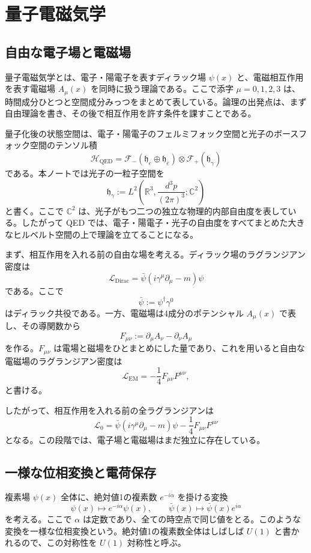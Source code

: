 \section{量子電磁気学}

\subsection{自由な電子場と電磁場}
量子電磁気学とは、電子・陽電子を表すディラック場 $\psi(x)$ と、電磁相互作用を表す電磁場 $A_\mu(x)$ を同時に扱う理論である。ここで添字 $\mu=0,1,2,3$ は、時間成分ひとつと空間成分みっつをまとめて表している。論理の出発点は、まず自由理論を書き、その後で相互作用を許す条件を課すことである。

量子化後の状態空間は、電子・陽電子のフェルミフォック空間と光子のボースフォック空間のテンソル積
\[
\mathcal{H}_{\mathrm{QED}}
=
\mathcal{F}_-(\mathfrak{h}_e\oplus \mathfrak{h}_{\bar e})
\otimes
\mathcal{F}_+(\mathfrak{h}_\gamma)
\]
である。本ノートでは光子の一粒子空間を
\[
\mathfrak{h}_\gamma
:=
L^2\!\left(\mathbb{R}^3,\frac{d^3p}{(2\pi)^3};\mathbb{C}^2\right)
\]
と書く。ここで $\mathbb{C}^2$ は、光子がもつ二つの独立な物理的内部自由度を表している。したがって QED では、電子・陽電子・光子の自由度をすべてまとめた大きなヒルベルト空間の上で理論を立てることになる。

まず、相互作用を入れる前の自由な場を考える。ディラック場のラグランジアン密度は
\[
\mathcal{L}_{\mathrm{Dirac}}
=
\bar{\psi}(i\gamma^\mu \partial_\mu - m)\psi
\]
である。ここで
\[
\bar{\psi}:=\psi^\dagger \gamma^0
\]
はディラック共役である。一方、電磁場は4成分のポテンシャル $A_\mu(x)$ で表し、その導関数から
\[
F_{\mu\nu}:=\partial_\mu A_\nu-\partial_\nu A_\mu
\]
を作る。$F_{\mu\nu}$ は電場と磁場をひとまとめにした量であり、これを用いると自由な電磁場のラグランジアン密度は
\[
\mathcal{L}_{\mathrm{EM}}
=
-\frac{1}{4}F_{\mu\nu}F^{\mu\nu},
\]
と書ける。

したがって、相互作用を入れる前の全ラグランジアンは
\[
\mathcal{L}_0
=
\bar{\psi}(i\gamma^\mu \partial_\mu - m)\psi
- \frac{1}{4}F_{\mu\nu}F^{\mu\nu}
\]
となる。この段階では、電子場と電磁場はまだ独立に存在している。

\subsection{一様な位相変換と電荷保存}
複素場 $\psi(x)$ 全体に、絶対値1の複素数 $e^{-i\alpha}$ を掛ける変換
\[
\psi(x)\mapsto e^{-i\alpha}\psi(x),
\qquad
\bar{\psi}(x)\mapsto \bar{\psi}(x)e^{i\alpha}
\]
を考える。ここで $\alpha$ は定数であり、全ての時空点で同じ値をとる。このような変換を一様な位相変換という。絶対値1の複素数全体はしばしば $U(1)$ と書かれるので、この対称性を $U(1)$ 対称性と呼ぶ。

